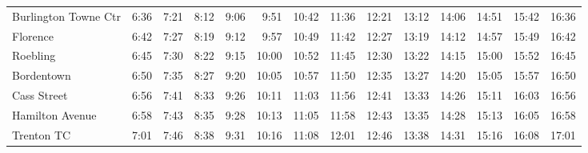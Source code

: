 \begin{center}
\begin{tabular}{@{}lrrrrrrrrrrrrr@{}}
Burlington Towne Ctr & 6:36 & 7:21 & 8:12 & 9:06 & 9:51 & 10:42 & 11:36 & 12:21 & 13:12 & 14:06 & 14:51 & 15:42 & 16:36 \\
Florence & 6:42 & 7:27 & 8:19 & 9:12 & 9:57 & 10:49 & 11:42 & 12:27 & 13:19 & 14:12 & 14:57 & 15:49 & 16:42 \\
Roebling & 6:45 & 7:30 & 8:22 & 9:15 & 10:00 & 10:52 & 11:45 & 12:30 & 13:22 & 14:15 & 15:00 & 15:52 & 16:45 \\
Bordentown & 6:50 & 7:35 & 8:27 & 9:20 & 10:05 & 10:57 & 11:50 & 12:35 & 13:27 & 14:20 & 15:05 & 15:57 & 16:50 \\
Cass Street & 6:56 & 7:41 & 8:33 & 9:26 & 10:11 & 11:03 & 11:56 & 12:41 & 13:33 & 14:26 & 15:11 & 16:03 & 16:56 \\
Hamilton Avenue & 6:58 & 7:43 & 8:35 & 9:28 & 10:13 & 11:05 & 11:58 & 12:43 & 13:35 & 14:28 & 15:13 & 16:05 & 16:58 \\
Trenton TC & 7:01 & 7:46 & 8:38 & 9:31 & 10:16 & 11:08 & 12:01 & 12:46 & 13:38 & 14:31 & 15:16 & 16:08 & 17:01 \\
\bottomrule\end{tabular}\end{center}
